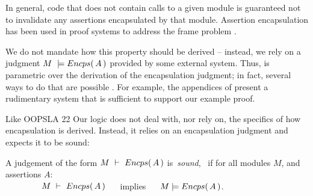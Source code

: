 {In general},  code that does not contain 
calls to a {given} module is guaranteed not to invalidate any assertions encapsulated by that module.
 Assertion encapsulation has been used in proof systems to {address}   the  {frame} problem
 \cite{objInvars,encaps}. 

We  do not mandate how this property should be derived -- instead, we rely on a judgment 
$M\ \models  \encaps{A}$ provided by some external system. 
Thus, \SpecLang is parametric over the derivation of the encapsulation
     judgment; in fact, several ways to do that are possible \cite{TAME2003,ownEncaps,objInvars}. For example,
 the appendices of
    \cite{necessityFull} present a 
    rudimentary system that is sufficient to support our example
    proof.  



Like OOPSLA 22 Our logic does not {deal with, nor} rely on, the specifics of  how   encapsulation
{is derived}.
{Instead, it relies} on an encapsulation judgment and expects it to be sound:

\begin{definition}
\label{lem:encap-soundness}
A judgement of the form $M\ \vdash\ {Encps(\, A\, )}$  is\  \emph{sound}, \ if 
for all modules $M$, and assertions $A$:\\

$\strut \hspace{1.5cm} M\ \vdash\ {Encps(\, A\, )} \ \ \ \ $ implies $\ \ \ \ \satisfies{M}{\encaps{A}}$.
\end{definition}


